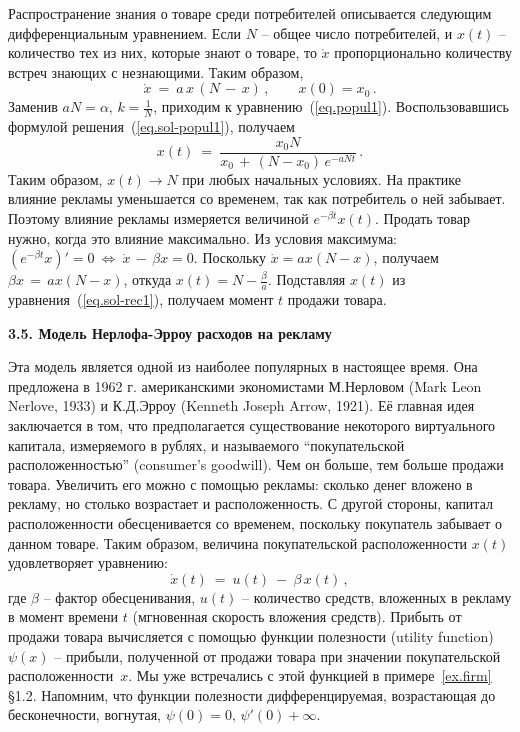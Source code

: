 \documentclass[12pt,a4paper]{article}
\begin{document}
Распространение знания о товаре среди потребителей описывается следующим дифференциальным уравнением.
Если $N$ -- общее число потребителей, и $x(t)$ -- количество тех из них, которые знают о товаре,
то $\dot x$ пропорционально количеству встреч знающих с незнающими. Таким образом,
\begin{equation}\label{eq.rec1}
\dot x \ = \ a \, x\, (N \, - \,  x)\, , \qquad x(0) = x_0\, .
\end{equation}
Заменив $aN = \alpha, \, k = \frac{1}{N}$, приходим к уравнению~(\ref{eq.popul1}).
Воспользовавшись формулой решения~(\ref{eq.sol-popul1}), получаем
\begin{equation}\label{eq.sol-rec1}
x(t)\ = \ \frac{x_0N}{x_0 \, + \, (N-x_0)\, e^{- a N t}}\, .
\end{equation}
Таким образом, $x(t) \to N$ при любых начальных условиях. На практике влияние рекламы
уменьшается со временем, так как потребитель о ней забывает. Поэтому влияние рекламы
измеряется величиной $e^{-\beta t}x(t)$. Продать товар нужно, когда это влияние максимально.
Из условия максимума: $(e^{-\beta t} x)' = 0\ \Leftrightarrow \
\dot x \, - \, \beta x = 0$. Поскольку $\dot x = a x(N-x)$,
получаем $\beta x \, = \,  a x(N-x)$, откуда $x(t) = N - \frac{\beta}{a}$.
Подставляя $x(t)$ из уравнения~(\ref{eq.sol-rec1}), получаем момент $t$ продажи товара.

\bigskip

\begin{center}
\textbf{3.5. Модель Нерлофа-Эрроу расходов на рекламу}
\end{center}

\bigskip


Эта модель является одной из наиболее популярных в настоящее время. Она предложена в 1962 г.
американскими экономистами М.Нерловом (Mark Leon Nerlove, 1933) и К.Д.Эрроу (Kenneth Joseph Arrow, 1921).
Её главная идея заключается в том, что
предполагается существование некоторого виртуального капитала, измеряемого в рублях, и называемого ``покупательской расположенностью''
(consumer's goodwill). Чем он больше, тем больше продажи товара. Увеличить его можно с помощью рекламы: сколько денег вложено в рекламу, но столько возрастает и расположенность. С другой стороны, капитал расположенности обесценивается со временем, поскольку покупатель забывает о данном товаре. Таким образом, величина покупательской
расположенности $x(t)$ удовлетворяет уравнению:
\begin{equation}\label{eq.ner}
\dot x(t)\ = \ u(t) \ - \  \beta \, x(t)\, ,
\end{equation}
где $\beta$ -- фактор обесценивания, $u(t)$ -- количество средств, вложенных в рекламу в момент времени $t$
(мгновенная скорость вложения средств). Прибыть от продажи  товара вычисляется с помощью
функции полезности (utility function) $\psi(x)$ -- прибыли, полученной от продажи товара при значении покупательской расположенности~$x$. Мы уже встречались с этой функцией в примере~\ref{ex.firm} \S 1.2.
Напомним, что функции полезности
дифференцируемая, возрастающая до бесконечности, вогнутая, $\psi (0) = 0, \, \psi'(0) +\infty$.
\end{document}
